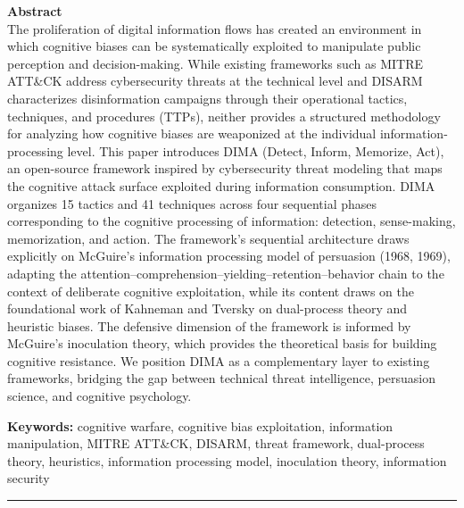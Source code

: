 \documentclass[11pt,a4paper]{article}
\begin{document}
\begin{center}
\parbox{0.92\textwidth}{
\textbf{\large Abstract}\\[6pt]
\small
The proliferation of digital information flows has created an environment in which cognitive biases can be systematically exploited to manipulate public perception and decision-making. While existing frameworks such as MITRE ATT\&CK address cybersecurity threats at the technical level and DISARM characterizes disinformation campaigns through their operational tactics, techniques, and procedures (TTPs), neither provides a structured methodology for analyzing how cognitive biases are weaponized at the individual information-processing level. This paper introduces DIMA (Detect, Inform, Memorize, Act), an open-source framework inspired by cybersecurity threat modeling that maps the cognitive attack surface exploited during information consumption. DIMA organizes 15 tactics and 41 techniques across four sequential phases corresponding to the cognitive processing of information: detection, sense-making, memorization, and action. The framework's sequential architecture draws explicitly on McGuire's information processing model of persuasion (1968, 1969), adapting the attention--comprehension--yielding--retention--behavior chain to the context of deliberate cognitive exploitation, while its content draws on the foundational work of Kahneman and Tversky on dual-process theory and heuristic biases. The defensive dimension of the framework is informed by McGuire's inoculation theory, which provides the theoretical basis for building cognitive resistance. We position DIMA as a complementary layer to existing frameworks, bridging the gap between technical threat intelligence, persuasion science, and cognitive psychology.

\vspace{6pt}
\textbf{Keywords:} cognitive warfare, cognitive bias exploitation, information manipulation, MITRE ATT\&CK, DISARM, threat framework, dual-process theory, heuristics, information processing model, inoculation theory, information security
}

\vspace{0.4cm}
\rule{\textwidth}{0.2pt}
\vspace{0.3cm}


\end{center}
\end{document}
